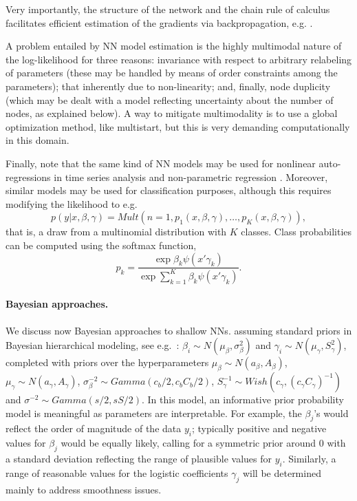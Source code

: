 \noindent    Very importantly,  the structure of the network and the 
    chain rule of calculus %
    facilitates efficient estimation of the gradients 
    via backpropagation, e.g. \cite{rumelhart1986learning}.
    
    A problem entailed by NN model estimation is the highly multimodal nature of
    the log-likelihood for three reasons:
    invariance with respect to arbitrary relabeling of
    parameters (these may
    be handled by means of order 
    constraints among the 
    parameters);
    that inherently due to non-linearity; and, finally, 
    node duplicity (which may be dealt 
    with a model reflecting uncertainty 
    about the number of nodes,
    as explained below).
A way to mitigate multimodality is to use a global optimization method, like multistart, but
this is very demanding computationally in this domain.

Finally, note that the same kind of NN models 
may be used for nonlinear auto-regressions in
time series analysis \cite{menchero} and 
non-parametric 
regression \cite{insuamuller}. Moreover,
similar models may be used for classification purposes,
although this 
 requires modifying the likelihood
\cite{bishop} to e.g.\
\begin{equation}
    p(y | x, \beta, \gamma) = Mult(n=1, 
    p_1 (x, \beta, \gamma) , \ldots, p_K (x, \beta, \gamma) ),
\end{equation}
that is, a draw from a multinomial distribution with $K$ classes. 
Class probabilities
 can be computed using the softmax function,
$$
p_k = \frac{\exp{\beta_k \psi(x'\gamma_k)}}{\exp{\sum_{k=1}^K \beta_k \psi(x'\gamma_k)}}.
$$


\paragraph{Bayesian approaches.}\label{bayeshallow}
We discuss now Bayesian approaches to shallow NNs.
assuming standard priors 
in Bayesian hierarchical modeling, see e.g.\ \cite{LavineWest}: 
$  \beta_i      \sim  N(\mu_\beta,\sigma_\beta^2)$
and 
  $\gamma_i     \sim  N(\mu_\gamma,S_\gamma^2)$,
  completed with priors over the hyperparameters
$\mu_\beta \sim N(a_\beta,A_\beta)$,
$\mu_\gamma \sim N(a_\gamma,A_\gamma)$,
$\sigma^{-2}_\beta \sim Gamma(c_b/2,c_bC_b/2)$,
$S_\gamma^{-1} \sim Wish(c_\gamma,(c_\gamma C_\gamma)^{-1})$ and
$\sigma^{-2} \sim Gamma(s/2, sS/2)$.
In this model, 
an informative prior probability model
is meaningful as parameters are interpretable. For example, the $\beta_ j$’s would reflect the
order of magnitude of the data $y_i$; typically positive and negative values for
$\beta _j$ would be equally likely, calling for a symmetric prior around 
0 with
a standard deviation reflecting the range of plausible values for $y_i$. Similarly,
a range of reasonable values for the logistic coefficients $\gamma_ j$ will be determined
mainly to address smoothness
issues.

